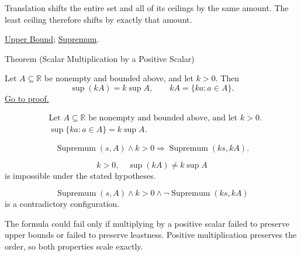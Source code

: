 \begin{remark*}[Interpretation]
Translation shifts the entire set and all of its ceilings by the same amount. The least ceiling therefore shifts by exactly that amount.
\end{remark*}

\begin{remark*}[Dependencies]
\hyperref[def:upper-bound]{Upper Bound};
\hyperref[def:supremum]{Supremum}.
\end{remark*}



\begin{theorembox}{Theorem (Scalar Multiplication by a Positive Scalar)}
\begin{theorem}
\label{thm:scalar-mult-positive}
Let $A\subseteq\mathbb{R}$ be nonempty and bounded above, and let $k>0$. Then
\[
  \sup(kA)=k\sup A,
  \qquad
  kA=\{ka:a\in A\}.
\]
\hyperref[prf:scalar-mult-positive]{Go to proof.}
\end{theorem}
\end{theorembox}

\begin{remark*}
\[
\begin{aligned}
&\text{Let }A\subseteq\mathbb{R}\text{ be nonempty and bounded above, and let }k>0.\\
&\sup\{ka:a\in A\}=k\sup A.
\end{aligned}
\]
\end{remark*}

\begin{remark*}
\[
\operatorname{Supremum}(s,A)\land k>0
\Longrightarrow
\operatorname{Supremum}(ks,kA).
\]
\end{remark*}

\begin{remark*}
\[
k>0,\quad \sup(kA)\ne k\sup A
\]
is impossible under the stated hypotheses.
\end{remark*}

\begin{remark*}
\[
\operatorname{Supremum}(s,A)\land k>0\land \neg\operatorname{Supremum}(ks,kA)
\]
is a contradictory configuration.
\end{remark*}

\begin{remark*}
The formula could fail only if multiplying by a positive scalar failed to preserve upper bounds or failed to preserve leastness. Positive multiplication preserves the order, so both properties scale exactly.
\end{remark*}

